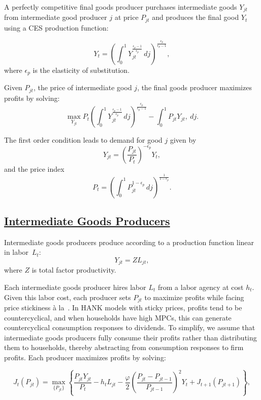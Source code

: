 \documentclass[\latexroot/\projectname]{subfiles}
\begin{document}
A perfectly competitive final goods producer purchases intermediate goods \( Y_{jt} \) from intermediate good producer $j$ at price \( P_{jt} \) and produces the final good \( Y_t \) using a CES production function:

\[
  Y_{t} = {\left(\int_{0}^{1} Y_{jt}^{\frac{\epsilon_{p}-1}{\epsilon_{p}}}\, dj\right)}^{\frac{\epsilon_{p}}{\epsilon_{p}-1}},
\]
where $\epsilon_{p}$ is the elasticity of substitution.

Given $P_{jt}$, the price of intermediate good $j$, the final goods producer maximizes profits by solving:
\[
  \max_{Y_{jt}} P_{t} {\left(\int_{0}^{1} Y_{jt}^{\frac{\epsilon_{p}-1}{\epsilon_{p}}}\, dj\right)}^{\frac{\epsilon_{p}}{\epsilon_{p}-1}} - \int_{0}^{1} P_{jt} Y_{jt} ,\ dj.
\]

The first order condition leads to demand for good $j$ given by
\[
  Y_{jt} = {\left(\frac {P_{jt}}{P_{t}}\right)}^{- \epsilon_{p}} Y_{t},
\]
and the price index
\[
  P_{t} = {\left(\int_{0}^{1} P_{jt}^{1-\epsilon_{p}}\,dj \right )}^{\frac{1}{1-\epsilon_{p}}}.
\]

\subsection{\href{https://econ-ark.github.io/HAFiscal/\#sec:hank-intermediate-goods-producers}{Intermediate Goods Producers}}\whenintegrated{\label{sec:hank-intermediate-goods-producers}}

Intermediate goods producers produce according to a production function linear in labor~$L_{t}$:
\[
  Y_{jt} =  Z L_{jt},
\]
where $Z$ is total factor productivity.

Each intermediate goods producer hires labor \( L_t \) from a labor agency at cost \( h_t \). Given this labor cost, each producer sets \( P_{jt} \) to maximize profits while facing price stickiness à la~\cite{Rotemberg1982}. In HANK models with sticky prices, profits tend to be countercyclical, and when households have high MPCs, this can generate countercyclical consumption responses to dividends. To simplify, we assume that intermediate goods producers fully consume their profits rather than distributing them to households, thereby abstracting from consumption responses to firm profits. Each producer maximizes profits by solving:

\[
  J_{t}\left(P_{jt}\right) = \max_{\{P_{jt}\}} \left\{\frac{P_{jt}Y_{jt}}{P_{t}} - h_{t} L_{jt} -  \frac{\varphi}{2}{\left( \frac{P_{jt} - P_{jt-1}}{P_{jt-1}} \right)}^{2} Y_{t}  + J_{t+1}\left(P_{jt+1}\right) \right\},
\]
\end{document}
